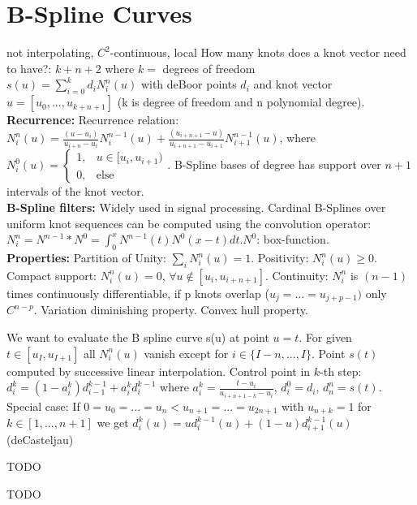 \section{B-Spline Curves}
not interpolating, $C^2$-continuous, local
How many knots does a knot vector need to have?: $k + n + 2$ where $k = $ degrees of freedom\\
 $s(u) = \sum_{i=0}^kd_iN_i^n(u)$ with deBoor points $d_i$ and knot vector $u = [u_0, ..., u_{k+n+1}]$ (k is degree of freedom and n polynomial degree).\\ 
\textbf{Recurrence:} Recurrence relation: $N_i^n(u) = \frac{(u - u_i)}{u_{i+n} - u_i} N_i^{n-1}(u) + \frac{(u_{i+n+1} - u)}{u_{i+n+1} - u_{i+1}} N_{i+1}^{n-1}(u)$, where $N_i^0(u) = \begin{cases} 1, & u \in [u_i, u_{i+1}) \\ 0, & \text{else} \end{cases}$. B-Spline bases of degree has support over $n+1$ intervals of the knot vector.\\
\textbf{B-Spline filters:} Widely used in signal processing. Cardinal B-Splines over uniform knot sequences can be computed using the convolution operator: \( N_i^n = N^{n-1} * N^0 = \int_{0}^{x} N^{n-1}(t)N^0(x - t) dt \).\( N^0 \): box-function.\\
\textbf{Properties:} 
Partition of Unity: $\sum_i N_i^n(u) = 1$. 
Positivity: $N_i^n(u) \geq 0$.
Compact support: $N_i^n(u) = 0$, $\forall u \notin [u_i, u_{i+n+1}]$.
Continuity: $N_i^n$ is $(n-1)$ times continuously differentiable, if p knots overlap ($u_j = ... = u_{j+p-1})$ only $C^{n-p}$.
Variation diminishing property.
Convex hull property.


 We want to evaluate the B spline curve s(u) at point $u=t$. For given $t \in [u_I, u_{I+1}]$ all $N_i^n(u)$ vanish except for $i \in \{I-n, ...,I\}$. Point $s(t)$ computed by successive linear interpolation. Control point in $k$-th step: $d_i^k = (1 - a_i^k)d_{i-1}^{k-1} + a_i^k d_i^{k-1} $ where $ a_i^k = \frac{t - u_i}{u_{i+n+1-k} - u_i} $, $d_i^0 = d_i$, $d_n^n = s(t)$. Special case: If $0 = u_0 = ... = u_n < u_{n+1} = ... = u_{2n+1}$ with $u_{n+k} = 1$ for $k \in [1, ...,n+1]$ we get $d_i^k(u)=ud_i^{k-1}(u)+(1-u)d_{i+1}^{k-1}(u)$ (deCasteljau)


 TODO


 TODO